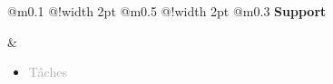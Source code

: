 \documentclass{article}
\begin{document}
\begin{tabular}
    {
        @{}m{}
        @{\hspace{0.001\textwidth}}!{\color{secondaryBlue}\vline width 2pt} %
        @{}m{0.5\textwidth}
        @{\hspace{0.025\textwidth}}!{\color{secondaryBlue}\vline width 2pt} %
        @{{\hspace{0.001\textwidth}}}m{0.3\textwidth}
    }
    \textcolor{secondaryBlue}
    {
        \textbf{Support}
    } 

    &
    \begin{itemize}
        [label={}, topsep=8pt, partopsep=0pt, itemsep=0.5pt, parsep=2pt,after=\vspace*{-\baselineskip}]
        \setlength{\itemsep}{10pt}
        \item \textcolor{darkGray}{Tâches}
        \begin{itemize}
        [label={\textcolor{gray!100}{\checkmark}}, topsep=8pt, partopsep=0pt, itemsep=0.5pt, parsep=2pt, after=\vspace*{-\baselineskip}] 


\end{itemize}
\end{itemize}
\end{tabular}
\end{document}
